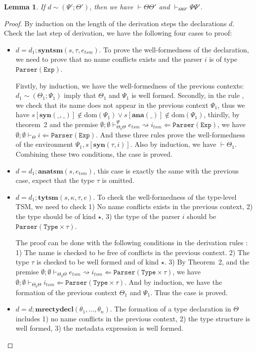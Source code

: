 \documentclass[letterpaper, notitlepage]{article}
\newtheorem{lemma}{Lemma}
\begin{document}
\begin{lemma} If $d\sim(\Psi';\Theta')$, then we have $\vdash\Theta\Theta'$ and $\vdash_{\Theta\Theta'}\Psi\Psi'$.
\end{lemma}
\begin{proof}
By induction on the length of the derivation steps the declarations $d$. Check the last step of derivation, we have the following four cases to proof:
\begin{itemize}
\item $d=d_1;\mathbf{syntsm}(s,\tau,e_{tsm})$. To prove the well-formedness of the declaration, we need to prove that no name conflicts exists and the parser $i$ is of type $\mathtt{Parser}(\mathtt{Exp})$. 

Firstly, by induction, we have the well-formedness of the previous contexts: $d_1\sim(\Theta_1;\Psi_1)$ imply that $\Theta_1$ and $\Psi_1$ is well formed. Secondly, in the rule , we check that its name does not appear in the previous context $\Psi_1$, thus we have $s[\mathbf{syn}(\_,\_)]\notin\text{dom}(\Psi_1)\lor s[\mathbf{ana}(\_)]\notin\text{dom}(\Psi_1)$, thirdly, by theorem~2 and the premise $\emptyset;\emptyset\vdash_{\Theta_0\Theta}^{\Psi}e_{tsm}\rightsquigarrow i_{tsm} \Leftarrow \mathtt{Parser(Exp)}$, we have $\emptyset;\emptyset\vdash_{\Theta}i\Leftarrow\mathtt{Parser}(\mathtt{Exp})$. And these three rules prove the well-formedness of the environment $\Psi_1,s[\mathbf{syn}(\tau,i)]$. Also by induction, we have $\vdash\Theta_1$. Combining these two conditions, the case is proved.
\item $d=d_1;\mathbf{anatsm}(s,e_{tsm})$, this case is exactly the same with the previous case, expect that the type $\tau$ is omitted.
\item $d=d_1;\mathbf{tytsm}(s,\kappa,\tau,e)$. To check the well-formedness of the type-level TSM, we need to check 1) No name conflicts exists in the previous context, 2) the type should be of kind $\star$, 3) the type of the parser $i$ should be $\mathtt{Parser}(\mathtt{Type}\times\tau)$.

The proof can be done with the following conditions in the derivation rules : 1) The name is checked to be free of conflicts in the previous context. 2) The type $\tau$ is checked to be well formed and of kind $\star$. 3) By Theorem~2, and the premise $\emptyset;\emptyset\vdash_{\Theta_0\Theta}e_{tsm}\rightsquigarrow i_{tsm}\Leftarrow \mathtt{Parser}(\mathtt{Type}\times\tau)$, we have  $\emptyset;\emptyset\vdash_{\Theta_0\Theta} i_{tsm}\Leftarrow \mathtt{Parser}(\mathtt{Type}\times\tau)$. And by induction, we have the formation of the previous context $\Theta_1$ and $\Psi_1$. Thus the case is proved.
\item $d=d;\mathbf{mrectydecl}(\theta_1,...,\theta_n)$. The formation of a type declaration in $\Theta$ includes 1) no name conflicts in the previous context, 2) the type structure is well formed, 3) the metadata expression is well formed.


\end{itemize}
\end{proof}
\end{document}
